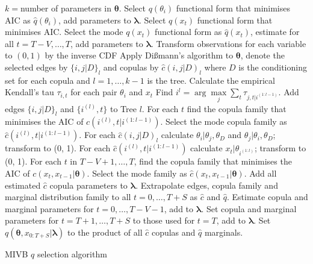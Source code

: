 \documentclass[12pt,a4paper]{article}%
\numberwithin{equation}{section}
\begin{document}
{{\begin{algorithm}[H]
 $k = $number of parameters in $\boldsymbol{\theta}$. \;
  {
   Select $q(\theta_i)$ functional form that minimises AIC as $\hat{q}(\theta_i)$, add parameters to $\boldsymbol{\lambda}$.\;
 }
  {
  Select $q(x_t)$ functional form that minimises AIC. \;
 }
 Select the mode $q(x_t)$ functional form as $\hat{q}(x_t)$, estimate for all $t = T-V, \dots, T$, add parameters to $\boldsymbol{\lambda}$.\;
 Transform observations for each variable to $(0, 1)$ by the inverse CDF\;
 Apply Di{\ss}mann's algorithm to $\boldsymbol{\theta}$, denote the selected edges by $\{i, j | D \}_l$ and copulas by $\hat{c}(i, j | D)_l$ where $D$ is the conditioning set for each copula and $l = 1, \dots, k-1$ is the tree. \;
  {
   {
    Calculate the empirical Kendall's tau $\tau_{i, t}$ for each pair $\theta_i$ and $x_t$ \;
  } 
  Find $i^{l} = \arg \underset{j}{\max} \sum_t \tau_{j, t | i^{(1:l-1)}}$. \;
  Add edges $\{i, j | D\}_l$ and $\{i^{(l)}, t\}$ to Tree $l$. \;
  For each $t$ find the copula family that minimises the AIC of $c(i^{(l)}, t |i^{(1:l-1)})$.\;
  Select the mode copula family as $\hat{c}(i^{(l)}, t |i^{(1:l-1)})$.\;
  For each $\hat{c}(i, j | D)_l$ calculate $\theta_i | \theta_j, \theta_D$ and $\theta_j | \theta_i, \theta_D$; transform to (0, 1).\;
  For each $\hat{c}(i^{(l)}, t |i^{(1:l-1)})$ calculate $x_t | \theta_{i^{(1:l)}}$; transform to (0, 1).\;
 }
  For each $t$ in $T-V+1, \dots, T$, find the copula family that minimises the AIC of $c(x_t, x_{t-1} | \boldsymbol{\theta}).$ \;
  Select the mode family as $\hat{c}(x_t, x_{t-1} | \boldsymbol{\theta})$. \;
  Add all estimated $\hat{c}$ copula parameters to $\boldsymbol{\lambda}$. \;
  Extrapolate edges, copula family and marginal distribution family to all $t = 0, \dots, T+S$ as $\hat{c}$ and $\hat{q}$. \;
  Estimate copula and marginal parameters for $t = 0, \dots, T-V-1$, add to $\boldsymbol{\lambda}$. \;
  Set copula and marginal parameters for $t = T+1, \dots, T+S$ to those used for $t = T$, add to $\boldsymbol{\lambda}$.\;
  Set $q(\boldsymbol{\theta}, x_{0:T+S} | \boldsymbol{\lambda})$ to the product of all $\hat{c}$ copulas and $\hat{q}$ marginals.\;
  \caption{MIVB $q$ selection algorithm}
  \label{alg:MIVB}
\end{algorithm}

}}
\end{document}
